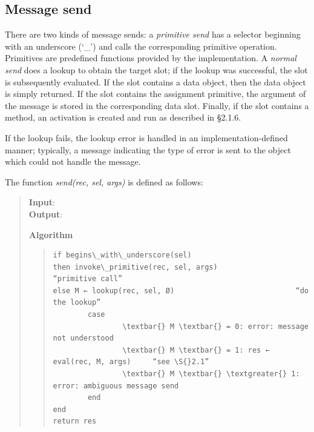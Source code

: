 \documentclass[letterpaper,10pt,english]{sphinxmanual}
\begin{document}
\subsection{Message send}
\label{langref:message-send}
There are two kinds of message sends: a \emph{primitive send} has a selector beginning with an underscore (‘\_’) and calls the corresponding primitive operation. Primitives are predefined functions provided by the implementation. A \emph{normal send} does a lookup to obtain the target slot; if the lookup was successful, the slot is subsequently evaluated. If the slot contains a data object, then the data object is simply returned. If the slot contains the assignment primitive, the argument of the message is stored in the corresponding data slot. Finally, if the slot contains a method, an activation is created and run as described in \S{}2.1.6.

If the lookup fails, the lookup error is handled in an implementation-defined manner; typically, a message indicating the type of error is sent to the object which could not handle the message.

The function \emph{send(rec, sel, args)} is defined as follows:
\begin{quote}
\begin{description}
\item[{\textbf{Input}:}] \leavevmode
{}

\item[{\textbf{Output}:}] \leavevmode
{}

\end{description}

\textbf{Algorithm}
\begin{quote}

\begin{Verbatim}[commandchars=\\\{\}]
if begins\_with\_underscore(sel)
then invoke\_primitive(rec, sel, args)                   “primitive call”
else M ← lookup(rec, sel, Ø)                            “do the lookup”
        case
                \textbar{} M \textbar{} = 0: error: message not understood
                \textbar{} M \textbar{} = 1: res ← eval(rec, M, args)     “see \S{}2.1”
                \textbar{} M \textbar{} \textgreater{} 1: error: ambiguous message send
        end
end
return res
\end{Verbatim}
\end{quote}
\end{quote}
\end{document}
